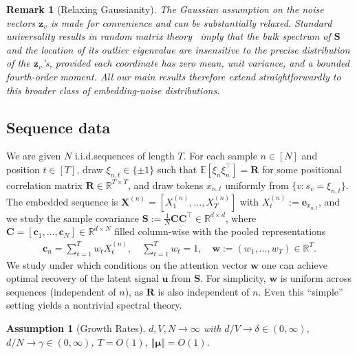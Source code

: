 \documentclass{article}
\def\vmu{{\bm{\mu}}}
\def\vc{{\bm{c}}}
\def\ve{{\bm{e}}}
\def\vu{{\bm{u}}}
\def\vw{{\bm{w}}}
\def\vz{{\bm{z}}}
\def\mC{{\bm{C}}}
\def\mR{{\bm{R}}}
\def\mS{{\bm{S}}}
\def\mX{{\bm{X}}}
\def\sR{{\mathbb{R}}}
\newcommand{\E}{\mathbb{E}}
\newtheorem{assumption}{Assumption}
\newtheorem{remark}{Remark}
\begin{document}
\begin{remark}[Relaxing Gaussianity]\label{rem:universality}
The Gaussian assumption on the noise vectors $\vz_v$ is made for convenience and can be substantially relaxed. Standard universality results in random matrix theory~\citep{bai2010spectral,couillet2022random} imply that the bulk spectrum of $\mS$ and the location of its outlier eigenvalue are insensitive to the precise distribution of the $\vz_v$'s, provided each coordinate has zero mean, unit variance, and a bounded fourth-order moment. All our main results therefore extend straightforwardly to this broader class of embedding-noise distributions.
\end{remark}

\subsection{Sequence data}\label{sec:seq_data}
We are given $N$ i.i.d.\@ sequences of length $T$. For each sample $n\in [N]$ and position $t\in [T]$, draw $\xi_{n,t} \in \{ \pm 1 \}$ such that $\E\left[ \xi_n \xi_n^\top \right] = \mR$ for some positional correlation matrix $\mR \in \sR^{T\times T}$, and draw tokens $x_{n,t}$ uniformly from $\{v:s_v = \xi_{n,t}\}$. The embedded sequence is $\mX^{(n)} = [ X_1^{(n)}, \ldots,  X_T^{(n)} ]$ with $ X_t^{(n)}:=\ve_{x_{n,t}}$, and we study the sample covariance $\mS := \frac1N \mC \mC^\top \in \sR^{d\times d}$, where $\mC = [\vc_1, \ldots, \vc_N]\in \sR^{d\times N}$ filled column-wise with the pooled representations
\begin{align}\label{eq:pooling}
    \vc_n = \sum_{t=1}^T w_t X_t^{(n)}, \quad \sum_{t=1}^T w_t=1, \quad \vw:=(w_1, \ldots, w_T) \in \sR^T.
\end{align}
We study under which conditions on the attention vector $\vw$ one can achieve optimal recovery of the latent signal $\vu$ from $\mS$. For simplicity, $\vw$ is uniform across sequences (independent of $n$), as $\mR$ is also independent of $n$. Even this ``simple'' setting yields a nontrivial spectral theory.

\begin{assumption}[Growth Rates]\label{ass:growth}
    $d,V,N\to \infty$ with $d/V\to \delta\in (0, \infty)$, $d/N \to \gamma\in (0, \infty)$, $T=O(1)$, $\Vert \vmu \Vert = O(1)$.
\end{assumption}
\end{document}
